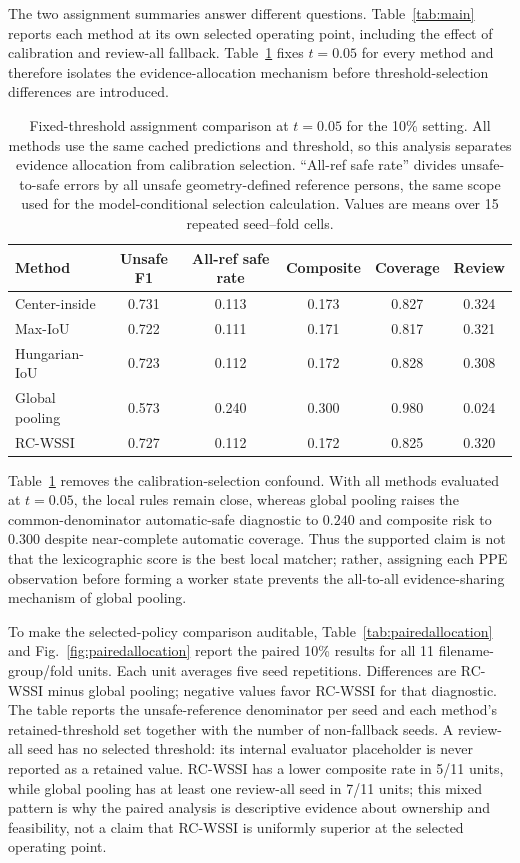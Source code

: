 \documentclass[iicol,pdflatex,sn-mathphys-num]{sn-jnl}
\begin{document}
The two assignment summaries answer different questions. Table~\ref{tab:main} reports each method at its own selected operating point, including the effect of calibration and review-all fallback. Table~\ref{tab:fixed_assignment} fixes $t=0.05$ for every method and therefore isolates the evidence-allocation mechanism before threshold-selection differences are introduced.

\begin{table}[t]
\caption{Fixed-threshold assignment comparison at $t=0.05$ for the 10\% setting. All methods use the same cached predictions and threshold, so this analysis separates evidence allocation from calibration selection. ``All-ref safe rate'' divides unsafe-to-safe errors by all unsafe geometry-defined reference persons, the same scope used for the model-conditional selection calculation. Values are means over 15 repeated seed--fold cells.}
\label{tab:fixed_assignment}
\centering
\small
\begin{tabular}{@{}lccccc@{}}
\toprule
Method & Unsafe F1 & All-ref safe rate & Composite & Coverage & Review \\
\midrule
Center-inside & 0.731 & 0.113 & 0.173 & 0.827 & 0.324 \\
Max-IoU & 0.722 & 0.111 & 0.171 & 0.817 & 0.321 \\
Hungarian-IoU & 0.723 & 0.112 & 0.172 & 0.828 & 0.308 \\
Global pooling & 0.573 & 0.240 & 0.300 & 0.980 & 0.024 \\
RC-WSSI & 0.727 & 0.112 & 0.172 & 0.825 & 0.320 \\
\bottomrule
\end{tabular}
\end{table}

Table~\ref{tab:fixed_assignment} removes the calibration-selection confound. With all methods evaluated at $t=0.05$, the local rules remain close, whereas global pooling raises the common-denominator automatic-safe diagnostic to $0.240$ and composite risk to $0.300$ despite near-complete automatic coverage. Thus the supported claim is not that the lexicographic score is the best local matcher; rather, assigning each PPE observation before forming a worker state prevents the all-to-all evidence-sharing mechanism of global pooling.

To make the selected-policy comparison auditable, Table~\ref{tab:pairedallocation} and Fig.~\ref{fig:pairedallocation} report the paired 10\% results for all 11 filename-group/fold units. Each unit averages five seed repetitions. Differences are RC-WSSI minus global pooling; negative values favor RC-WSSI for that diagnostic. The table reports the unsafe-reference denominator per seed and each method's retained-threshold set together with the number of non-fallback seeds. A review-all seed has no selected threshold: its internal evaluator placeholder is never reported as a retained value. RC-WSSI has a lower composite rate in 5/11 units, while global pooling has at least one review-all seed in 7/11 units; this mixed pattern is why the paired analysis is descriptive evidence about ownership and feasibility, not a claim that RC-WSSI is uniformly superior at the selected operating point.
\end{document}
